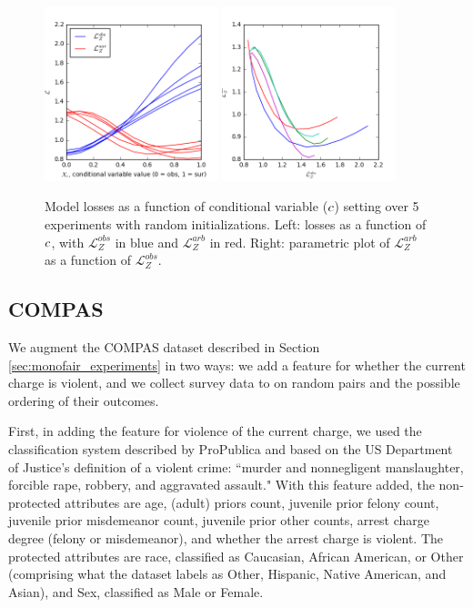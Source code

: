         \begin{figure}
            \centering
            \includegraphics[width=0.45\textwidth]{fig_softmono/synthetic_loss.png}
            \includegraphics[width=0.45\textwidth]{fig_softmono/synthetic_loss_tradeoff.png}
            \caption{
                Model losses as a function of conditional variable ($c$) setting over 5 experiments with random initializations.  Left: losses as a function of $c$, with $\mathcal{L}_Z^{obs}$ in blue and $\mathcal{L}_Z^{arb}$ in red.  Right: parametric plot of $\mathcal{L}_Z^{arb}$ as a function of $\mathcal{L}_Z^{obs}$.
            }
            \label{fig:sm_synthetic_losses}
        \end{figure}
        
    \subsection{COMPAS}\label{subsec:sm_compas}
    
        We augment the COMPAS dataset described in Section \ref{sec:monofair_experiments} in two ways: we add a feature for whether the current charge is violent, and we collect survey data to on random pairs and the possible ordering of their outcomes.
        
        First, in adding the feature for violence of the current charge, we used the classification system described by ProPublica \citep{larson2016we} and based on the US Department of Justice's definition of a violent crime: ``murder and nonnegligent manslaughter, forcible rape, robbery, and aggravated assault."  With this feature added, the non-protected attributes are age, (adult) priors count, juvenile prior felony count, juvenile prior misdemeanor count, juvenile prior other counts, arrest charge degree (felony or misdemeanor), and whether the arrest charge is violent.  The protected attributes are race, classified as Caucasian, African American, or Other (comprising what the dataset labels as Other, Hispanic, Native American, and Asian), and Sex, classified as Male or Female.
        
